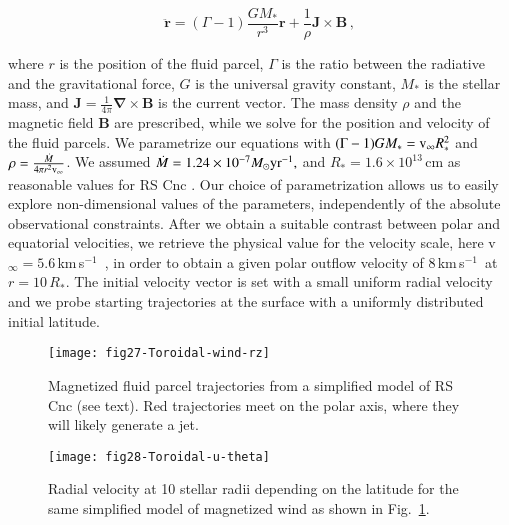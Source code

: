 \documentclass{aa}
\newcommand{\kms}{\,km\,s$^{-1}$~}
\begin{document}
\begin{equation}
\boldsymbol{\ddot{r}}=(\Gamma-1)\frac{GM_{*}}{r^{3}}\boldsymbol{r}+\frac{1}{\rho}\boldsymbol{J}\times\boldsymbol{B} \, ,
\end{equation}

where $r$ is the position of the fluid parcel, $\Gamma$ is the ratio
between the radiative and the gravitational force, $G$ is the
universal gravity constant, $M_{*}$ is the stellar mass, and
$\boldsymbol{J}=\frac{1}{4\pi}\boldsymbol{\nabla}\times\boldsymbol{B}$
is the current vector. The mass density $\rho$ and the magnetic field
$\boldsymbol{B}$ are prescribed, while we solve for the position and
velocity of the fluid parcels. We parametrize our equations with
$(\Gamma-1)GM_{*}={\rm v}_{\infty}R_{*}^{2}$ and
$\rho=\frac{\dot{M}}{4\pi r^{2}{\rm v}_{\infty}}$.  We assumed
$\dot{M}=1.24\times10^{-7}M_{\odot}{\rm yr}^{-1},$ and
$R_{*}=1.6\times10^{13}$\,cm as reasonable values for RS Cnc
\citep{hmwng14}. Our choice of parametrization allows us to easily
explore non-dimensional values of the parameters, independently of the
absolute observational constraints.  After we obtain a suitable
contrast between polar and equatorial velocities, we retrieve the
physical value for the velocity scale, here v$_{\infty}=5.6$\kms, in
order to obtain a given polar outflow velocity of 8\kms at
$r=10\,R_{*}$. The initial velocity vector is set with a small uniform
radial velocity and we probe starting trajectories at the surface with
a uniformly distributed initial latitude.

\begin{figure}
\texttt{[image: fig27-Toroidal-wind-rz]}
\caption{Magnetized fluid parcel trajectories from a simplified model of RS Cnc
(see text). Red trajectories meet on the polar axis, where they will
likely generate a jet. \label{fig:Magnetised-fluid-parcels}}
\end{figure}
\begin{figure}
\texttt{[image: fig28-Toroidal-u-theta]}
\caption{Radial velocity at 10 stellar radii depending on the latitude for
the same simplified model of magnetized wind as shown in 
Fig.~\ref{fig:Magnetised-fluid-parcels}.
\label{fig:Radial-velocity-at}}
\end{figure}
\end{document}

